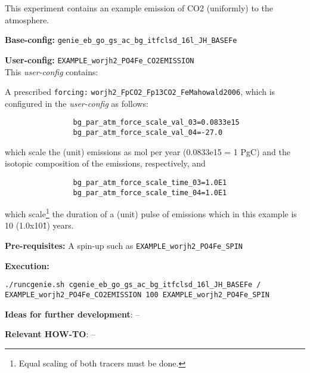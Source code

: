 \documentclass[10pt,twoside]{article}
\begin{document}
This experiment contains an example emission of CO2 (uniformly) to the atmosphere.

\noindent \textbf{Base-config:} \texttt{genie\_eb\_go\_gs\_ac\_bg\_itfclsd\_16l\_JH\_BASEFe}

\noindent \textbf{User-config:} \texttt{EXAMPLE\_worjh2\_PO4Fe\_CO2EMISSION}
\\ This \textit{user-config} contains:

\begin{compactitem}
        \item A prescribed \texttt{forcing:} \texttt{worjh2\_FpCO2\_Fp13CO2\_FeMahowald2006}, which is configured in the \textit{user-config} as follows:
        \begin{compactenum}
                \item 
                \begin{verbatim}
                bg_par_atm_force_scale_val_03=0.0833e15
                bg_par_atm_force_scale_val_04=-27.0
                \end{verbatim}
                which scale the (unit) emissions as mol per year (0.0833e15 = 1 PgC) and the isotopic composition of the emissions, respectively, and
                \item 
                \begin{verbatim}
                bg_par_atm_force_scale_time_03=1.0E1
                bg_par_atm_force_scale_time_04=1.0E1
                \end{verbatim}
                which scale\footnote{Equal scaling of both tracers must be done.} the duration of a (unit) pulse of emissions which in this example is 10 (1.0x10\^1) years.
        \end{compactenum}
\end{compactitem}

\noindent \textbf{Pre-requisites:} A spin-up such as \texttt{EXAMPLE\_worjh2\_PO4Fe\_SPIN}

\noindent \textbf{Execution:}
\vspace{-5pt}\begin{verbatim}
./runcgenie.sh cgenie_eb_go_gs_ac_bg_itfclsd_16l_JH_BASEFe / 
EXAMPLE_worjh2_PO4Fe_CO2EMISSION 100 EXAMPLE_worjh2_PO4Fe_SPIN
\end{verbatim}\vspace{-5pt}

\noindent \textbf{Ideas for further development}: --

\noindent \textbf{Relevant HOW-TO}: --
\end{document}
